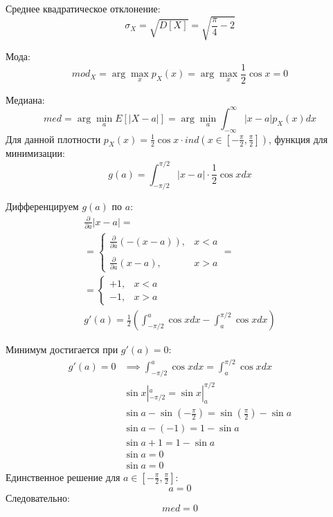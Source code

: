 \documentclass[a4paper,14pt]{extarticle}
\begin{document}
            Среднее квадратическое отклонение:
            \[\boxed{\sigma_X = \sqrt{D[X]} = \sqrt{\frac{\pi}{4} - 2}}\]
            
            Мода:
            \[\boxed{mod_X = \arg \max_x p_X(x) = \arg \max_x \frac{1}{2} \cos x = 0}\]
            
            Медиана:
            $$
            med = \arg\min_a E[|X - a|] = \arg\min_a \int_{-\infty}^{\infty} |x - a| p_X(x) dx
            $$
            Для данной плотности $p_X(x) = \frac{1}{2} \cos x \cdot ind\left(x \in \left[-\frac{\pi}{2}, \frac{\pi}{2}\right]\right)$, функция для минимизации:
            $$
            g(a) = \int_{-\pi/2}^{\pi/2} |x - a| \cdot \frac{1}{2} \cos x dx
            $$
            
            Дифференцируем $g(a)$ по $a$:
            \begin{gather*}
                \frac{\partial}{\partial a} |x - a| = \\
                = \begin{cases}
                      \frac{\partial}{\partial a} (-(x - a)), & x < a \\ \\
                      \frac{\partial}{\partial a} (x - a), & x > a
                \end{cases} = \\
                = \begin{cases}
                      +1, & x < a \\
                      -1, & x > a
                \end{cases} \\
                g'(a) = \frac{1}{2} \left( \int_{-\pi/2}^{a} \cos x dx - \int_{a}^{\pi/2} \cos x dx \right)
            \end{gather*}
            
            Минимум достигается при $g'(a) = 0$:
            \begin{align*}
                g'(a) = 0 &\implies \int_{-\pi/2}^{a} \cos x dx = \int_{a}^{\pi/2} \cos x dx \\
                & \sin x|_{-\pi/2}^{a} = \sin x|_{a}^{\pi/2} \\
                & \sin a - \sin\left(-\frac{\pi}{2}\right) = \sin\left(\frac{\pi}{2}\right) - \sin a \\
                & \sin a - (-1) = 1 - \sin a \\
                & \sin a + 1 = 1 - \sin a \\
                &   \sin a = 0 \\
                & \sin a = 0
            \end{align*}
            Единственное решение для $a \in \left[-\frac{\pi}{2}, \frac{\pi}{2}\right]$:
            $$
            a = 0
            $$
            Следовательно:
            $$
            \boxed{med = 0}
            $$
            
\end{document}
